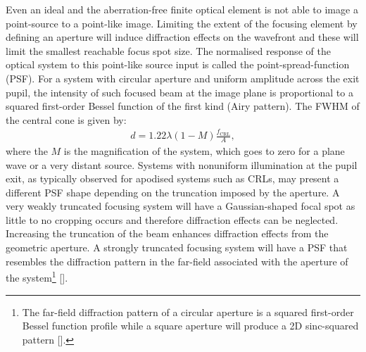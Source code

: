 \begin{refsection}
Even an ideal and the aberration-free finite optical element is not able to image a point-source to a point-like image. Limiting the extent of the focusing element by defining an aperture will induce diffraction effects on the wavefront and these will limit the smallest reachable focus spot size. The normalised response of the optical system to this point-like source input is called the point-spread-function (PSF). For a system with circular aperture and uniform amplitude across the exit pupil, the intensity of such focused beam at the image plane is proportional to a squared first-order Bessel function of the first kind (Airy pattern). The FWHM of the central cone is given by:
\begin{align}\label{eq:PSF}
    d = 1.22\lambda (1-M)\frac{f_{\text{CRL}}}{A},
\end{align}{}
where the $M$ is the magnification of the system, which goes to zero for a plane wave or a very distant source. Systems with nonuniform illumination at the pupil exit, as typically observed for apodised systems such as CRLs, may present a different PSF shape depending on the truncation imposed by the aperture. A very weakly truncated focusing system will have a Gaussian-shaped focal spot as little to no cropping occurs and therefore diffraction effects can be neglected. Increasing the truncation of the beam enhances diffraction effects from the geometric aperture. A strongly truncated focusing system will have a PSF that resembles the diffraction pattern in the far-field associated with the aperture of the system\footnote{The far-field diffraction pattern of a circular aperture is a squared first-order Bessel function profile while a square aperture will produce a 2D sinc-squared pattern [\cite{Guasti1993}].} [\cite{Mahajan1986}]. 



\end{refsection}
